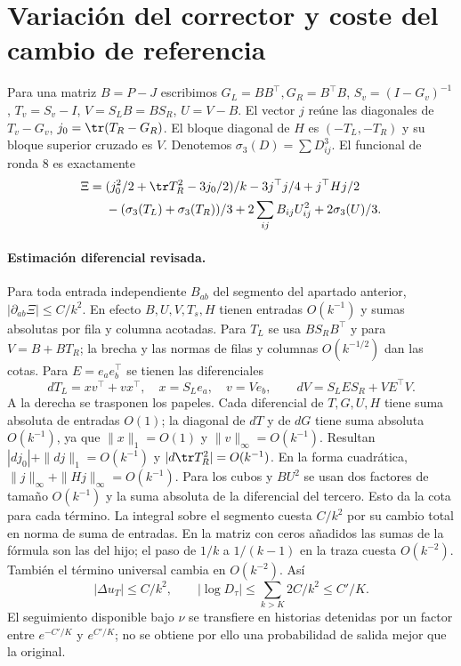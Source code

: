 \section{Variación del corrector y coste del cambio de referencia}
Para una matriz $B=P-J$ escribimos $G_L=BB^\top,G_R=B^\top B$,
$S_v=(I-G_v)^{-1}$, $T_v=S_v-I$, $V=S_LB=BS_R$, $U=V-B$.
El vector $j$ reúne las diagonales de $T_v-G_v$, $j_0=\tr(T_R-G_R)$.
El bloque diagonal de $H$ es $(-T_L,-T_R)$ y su bloque superior cruzado es $V$.
Denotemos $\sigma_3(D)=\sum D_{ij}^3$. El funcional de ronda 8 es exactamente
\begin{align*}
 \Xi={}&(j_0^2/2+\tr T_R^2-3j_0/2)/k
 -3j^\top j/4+j^\top Hj/2\\
 &-(\sigma_3(T_L)+\sigma_3(T_R))/3+2\sum_{ij}B_{ij}U_{ij}^2+2\sigma_3(U)/3 .
\end{align*}
\paragraph{Estimación diferencial revisada.}
Para toda entrada independiente $B_{ab}$ del segmento del apartado anterior,
$|\partial_{ab}\Xi|\le C/k^2$. En efecto $B,U,V,T_s,H$ tienen entradas
$O(k^{-1})$ y sumas absolutas por fila y columna acotadas. Para $T_L$ se usa
$B S_RB^\top$ y para $V=B+BT_R$; la brecha y las normas de filas y columnas
$O(k^{-1/2})$ dan las cotas. Para $E=e_ae_b^\top$ se tienen las diferenciales
\[
 dT_L=xv^\top+vx^\top,\quad x=S_Le_a,\quad v=Ve_b,\qquad
 dV=S_LE S_R+VE^\top V.
\]
A la derecha se trasponen los papeles. Cada diferencial de $T,G,U,H$ tiene
suma absoluta de entradas $O(1)$; la diagonal de $dT$ y de $dG$ tiene suma absoluta
$O(k^{-1})$, ya que $\|x\|_1=O(1)$ y $\|v\|_\infty=O(k^{-1})$.
Resultan $|dj_0|+\|dj\|_1=O(k^{-1})$ y $|d\tr T_R^2|=O(k^{-1})$.
En la forma cuadrática, $\|j\|_\infty+\|Hj\|_\infty=O(k^{-1})$.
Para los cubos y $BU^2$ se usan dos factores de tamaño $O(k^{-1})$ y la
suma absoluta de la diferencial del tercero. Esto da la cota para cada término.
La integral sobre el segmento cuesta $C/k^2$ por su cambio total en norma de
suma de entradas. En la matriz con ceros añadidos las sumas de la fórmula son
las del hijo; el paso de $1/k$ a $1/(k-1)$ en la traza cuesta $O(k^{-2})$.
También el término universal cambia en $O(k^{-2})$. Así
\[
 |\Delta u_T|\le C/k^2,\qquad
 |\log D_\tau|\le\sum_{k>K}2C/k^2\le C'/K.
\]
El seguimiento disponible bajo $\nu$ se transfiere en historias detenidas por un
factor entre $e^{-C'/K}$ y $e^{C'/K}$; no se obtiene por ello una probabilidad
de salida mejor que la original.
